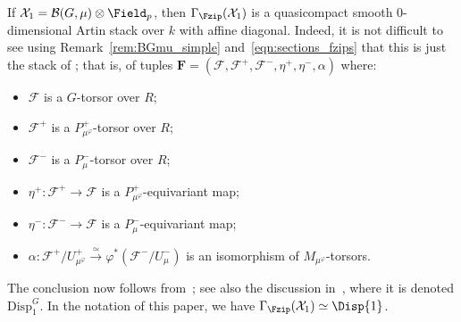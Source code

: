 \documentclass[10pt]{amsart}
\begin{document}
\subsubsection{}
If $\mathcal{X}_1 =\mathcal{B}(G,\mu)\otimes\Field_p$, then $\Gamma_{\Fzip}(\mathcal{X}_1)$ is a quasicompact smooth $0$-dimensional Artin stack over $k$ with affine diagonal. Indeed, it is not difficult to see using Remark~\ref{rem:BGmu_simple} and~\eqref{eqn:sections_fzips} that this is just the stack of ; that is, of tuples $\bm{F} = (\mathcal{F},\mathcal{F}^+,\mathcal{F}^-,\eta^+,\eta^-,\alpha)$ where:
\begin{itemize}
   \item $\mathcal{F}$ is a $G$-torsor over $R$;
   \item $\mathcal{F}^+$ is a $P^+_{\mu^\varphi}$-torsor over $R$;
   \item $\mathcal{F}^-$ is a $P^-_\mu$-torsor over $R$;
   \item $\eta^+:\mathcal{F}^+\to \mathcal{F}$ is a $P^+_{\mu^\varphi}$-equivariant map;
   \item $\eta^-:\mathcal{F}^-\to \mathcal{F}$ is a $P^-_\mu$-equivariant map;
   \item $\alpha:\mathcal{F}^+/U^+_{\mu^\varphi}\xrightarrow{\simeq}\varphi^*\left(\mathcal{F}^-/U^-_{\mu}\right)$ is an isomorphism of $M_{\mu^\varphi}$-torsors.
\end{itemize}
The conclusion now follows from~\cite[\S 3.3]{Pink2015-ye}; see also the discussion in~\cite[\S 3.2]{drinfeld2023shimurian}, where it is denoted $\mathrm{Disp}^G_1$. In the notation of this paper, we have $\Gamma_{\Fzip}(\mathcal{X}_1) \simeq \Disp{1}$.
\end{document}
